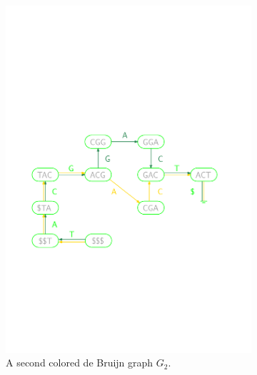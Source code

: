 \begin{figure}[h!t]
\begin{subfigure}[b]{0.45\textwidth}
\includegraphics[width=1.0\textwidth]{varimerge/limegraph.pdf}
\caption{A second colored de Bruijn graph $G_2$.}

\end{subfigure}

\begin{subfigure}[b]{0.45\textwidth}


\end{subfigure}
\end{figure}
